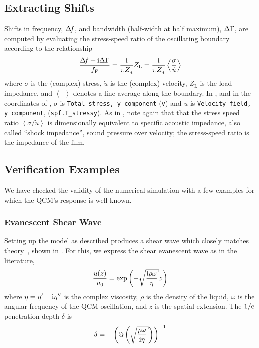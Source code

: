 \subsection{Extracting Shifts}
Shifts in frequency, $\Delta\!f$, and bandwidth (half-width at half maximum),
$\Delta\Gamma$, are computed by evaluating the stress-speed ratio of the oscillating
boundary according to the relationship
\begin{equation}
 \frac{\Delta\!f+{\mathrm{i}}\Delta\Gamma}{f_{\mathrm{F}}}=\frac{{\mathrm{i}}}{\pi Z_{\mathrm{q}}}Z_\mathrm{L} =\frac{{\mathrm{i}}}{\pi Z_{\mathrm{q}}}\left<\frac{\sigma}{\dot{u}}\right>
\label{eqn:comsolextracttwo}
\end{equation}
where $\sigma$ is the (complex) stress, $\dot{u}$ is the (complex)
velocity, $Z_\mathrm{L}$ is the load impedance, and $\left<\enspace\right>$
denotes a line average along the boundary.  In \comsol, and in the
coordinates of , $\sigma$ is \texttt{Total stress,
y component} (\texttt{v}) and $\dot{u}$ is \texttt{Velocity field, y
component}, (\texttt{spf.T\_stressy}).  As in ,
note again that that the stress speed ratio $\left<\sigma/\dot{u}\right>$
is dimensionally equivalent to specific acoustic impedance, also called
``shock impedance'', sound pressure over velocity; the
stress-speed ratio is the impedance of the film. 

\subsection{Verification Examples}
We have checked the validity of the numerical simulation with a few
examples for which the QCM's response is well known.  

\subsubsection{Evanescent Shear Wave}
Setting up the model as described produces a shear wave which closely
matches theory~\cite{steinem2007piezoelectric}, shown in
.  For this, we express the shear evanescent wave
as in the literature,
\begin{equation}
 \frac{u(z)}{u_0} = \exp\left(-\sqrt{\frac{\mi \rho \omega}{\eta}} z\right)
\end{equation}
where $\eta=\eta'-{\mathrm{i}}\eta''$ is the complex viscosity, $\rho$ is the density
of the liquid, $\omega$ is the angular frequency of the QCM oscillation,
and $z$ is the spatial extension.  The $1/{\mathrm{e}}$ penetration depth $\delta$ is
\begin{equation}
 \delta =
 -\left(\Im\left(\sqrt{\frac{\rho\omega}{\mi\eta}}\right)\right)^{-1}
 \label{eqn:suppshearwavedelta}
\end{equation}

